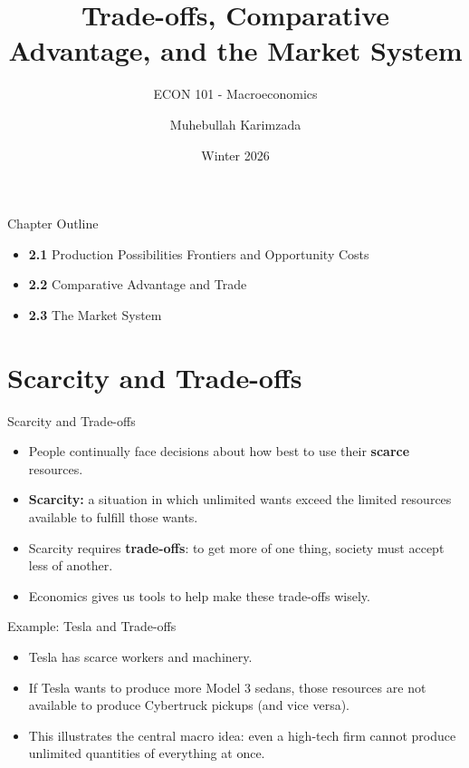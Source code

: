 \documentclass[aspectratio=169]{beamer}
\title{\textbf{Trade-offs, Comparative Advantage, and the Market System \vspace{.5cm}\\  }}
\subtitle{ {\large ECON 101 - Macroeconomics}}
\author{Muhebullah Karimzada}
\date{Winter 2026}
\begin{document}
\begin{frame}[plain]
  \titlepage
\end{frame}

\begin{frame}{Chapter Outline}
\transfade
\begin{itemize}
  \item \textbf{2.1} Production Possibilities Frontiers and Opportunity Costs
  \item \textbf{2.2} Comparative Advantage and Trade
  \item \textbf{2.3} The Market System
\end{itemize}
\end{frame}

\section{Scarcity and Trade-offs}

\begin{frame}{Scarcity and Trade-offs}
\transfade
\begin{itemize}
  \item People continually face decisions about how best to use their \textbf{scarce} resources.
  \item \textbf{Scarcity:} a situation in which unlimited wants exceed the limited resources available to fulfill those wants.
  \item Scarcity requires \textbf{trade-offs}: to get more of one thing, society must accept less of another.
  \item Economics gives us tools to help make these trade-offs wisely.
\end{itemize}
\end{frame}

\begin{frame}{Example: Tesla and Trade-offs}
\transfade
\begin{itemize}
  \item Tesla has scarce workers and machinery.
  \item If Tesla wants to produce more Model 3 sedans, those resources are not available to produce Cybertruck pickups (and vice versa).
  \item This illustrates the central macro idea: even a high-tech firm cannot produce unlimited quantities of everything at once.
\end{itemize}
\end{frame}
\end{document}
